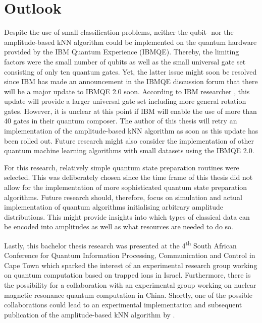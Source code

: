 \chapter{Outlook}\label{sec:outlook}

Despite the use of small classification problems, neither the qubit- nor the amplitude-based kNN algorithm could be implemented on the quantum hardware provided by the IBM Quantum Experience (IBMQE). Thereby, the limiting factors were the small number of qubits as well as the small universal gate set consisting of only ten quantum gates. Yet, the latter issue might soon be resolved since IBM has made an announcement in the IBMQE discussion forum that there will be a major update to IBMQE 2.0 soon. According to IBM researcher , this update will provide a larger universal gate set including more general rotation gates. However, it is unclear at this point if IBM will enable the use of more than 40 gates in their quantum composer. The author of this thesis will retry an implementation of the amplitude-based kNN algorithm as soon as this update has been rolled out. Future research might also consider the implementation of other quantum machine learning algorithms with small datasets using the IBMQE 2.0.

For this research, relatively simple quantum state preparation routines were selected. This was deliberately chosen since the time frame of this thesis did not allow for the implementation of more sophisticated quantum state preparation algorithms. Future research should, therefore, focus on simulation and actual implementation of quantum algorithms initialising arbitrary amplitude distributions. This might provide insights into which types of classical data can be encoded into amplitudes as well as what resources are needed to do so.

Lastly, this bachelor thesis research was presented at the 4\textsuperscript{th} South African Conference for Quantum Information Processing, Communication and Control in Cape Town which sparked the interest of an experimental research group working on quantum computation based on trapped ions in Israel. Furthermore, there is the possibility for a collaboration with an experimental group working on nuclear magnetic resonance quantum computation in China. Shortly, one of the possible collaborations could lead to an experimental implementation and subsequent publication of the amplitude-based kNN algorithm by .

